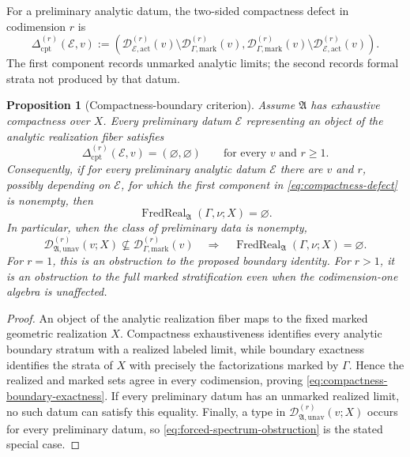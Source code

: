 \documentclass[11pt,letterpaper,twoside]{article}
\theoremstyle{plain}
\newtheorem{proposition}[theorem]{Proposition}
\theoremstyle{definition}
\theoremstyle{remark}
\begin{document}
For a preliminary analytic datum, the two-sided compactness defect in codimension $r$ is
\begin{equation}\label{eq:compactness-defect}
 \Delta^{(r)}_{\mathrm{cpt}}(\mathcal E,v)
 :=\left(
 \mathcal D^{(r)}_{\mathcal E,\mathrm{act}}(v)
 \setminus\mathcal D^{(r)}_{\Gamma,\mathrm{mark}}(v),
 \mathcal D^{(r)}_{\Gamma,\mathrm{mark}}(v)
 \setminus\mathcal D^{(r)}_{\mathcal E,\mathrm{act}}(v)
 \right).
\end{equation}
The first component records unmarked analytic limits; the second records formal strata not produced by that datum.

\begin{proposition}[Compactness-boundary criterion]\label{prop:compactness-criterion}
Assume $\mathfrak A$ has exhaustive compactness over $X$.  Every preliminary datum $\mathcal E$ representing an object of the analytic realization fiber satisfies
\begin{equation}\label{eq:compactness-boundary-exactness}
 \Delta^{(r)}_{\mathrm{cpt}}(\mathcal E,v)=(\varnothing,\varnothing)
 \qquad\text{for every $v$ and $r\geq1$.}
\end{equation}
Consequently, if for every preliminary analytic datum $\mathcal E$ there are $v$ and $r$, possibly depending on $\mathcal E$, for which the first component in \eqref{eq:compactness-defect} is nonempty, then
\[
 \operatorname{FredReal}_{\mathfrak A}(\Gamma,\nu;X)=\varnothing.
\]
In particular, when the class of preliminary data is nonempty,
\begin{equation}\label{eq:forced-spectrum-obstruction}
 \mathcal D^{(r)}_{\mathfrak A,\mathrm{unav}}(v;X)
 \nsubseteq\mathcal D^{(r)}_{\Gamma,\mathrm{mark}}(v)
 \quad\Longrightarrow\quad
 \operatorname{FredReal}_{\mathfrak A}(\Gamma,\nu;X)=\varnothing.
\end{equation}
For $r=1$, this is an obstruction to the proposed boundary identity.  For $r>1$, it is an obstruction to the full marked stratification even when the codimension-one algebra is unaffected.
\end{proposition}

\begin{proof}
An object of the analytic realization fiber maps to the fixed marked geometric realization $X$.  Compactness exhaustiveness identifies every analytic boundary stratum with a realized labeled limit, while boundary exactness identifies the strata of $X$ with precisely the factorizations marked by $\Gamma$.  Hence the realized and marked sets agree in every codimension, proving \eqref{eq:compactness-boundary-exactness}.  If every preliminary datum has an unmarked realized limit, no such datum can satisfy this equality.  Finally, a type in $\mathcal D^{(r)}_{\mathfrak A,\mathrm{unav}}(v;X)$ occurs for every preliminary datum, so \eqref{eq:forced-spectrum-obstruction} is the stated special case.
\end{proof}
\end{document}
